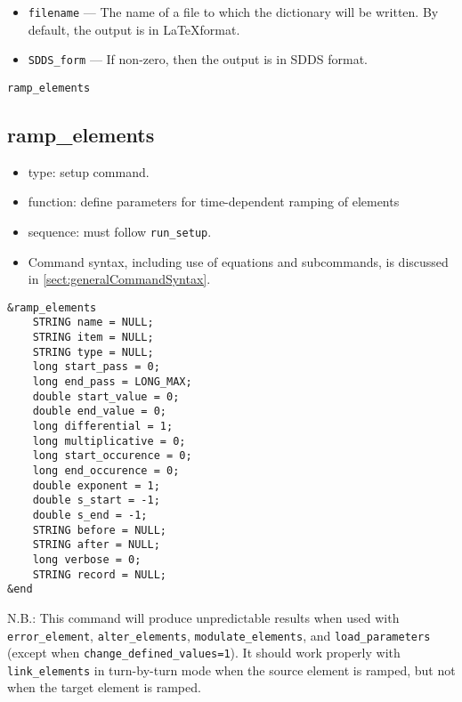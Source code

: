 \documentclass[11pt]{article}
\begin{document}
\begin{itemize}
\item \verb|filename| --- The name of a file to which the dictionary will be written.  By default, the 
  output is in \LaTeX format.
\item \verb|SDDS_form| --- If non-zero, then the output is in  SDDS format.
\end{itemize}

\newpage
\begin{center}{\Large\verb|ramp_elements|}\end{center}
\subsection{ramp\_elements\label{subsec:rampelements}}

\begin{itemize}
\item type: setup command.
\item function: define parameters for time-dependent ramping of elements
\item sequence: must follow \verb|run_setup|.
\item Command syntax, including use of equations and subcommands, is discussed in \ref{sect:generalCommandSyntax}.
\end{itemize}

\begin{verbatim}
&ramp_elements
    STRING name = NULL;
    STRING item = NULL;
    STRING type = NULL;
    long start_pass = 0;
    long end_pass = LONG_MAX;
    double start_value = 0;
    double end_value = 0;
    long differential = 1;
    long multiplicative = 0;
    long start_occurence = 0;
    long end_occurence = 0;
    double exponent = 1;
    double s_start = -1;
    double s_end = -1;
    STRING before = NULL;
    STRING after = NULL;
    long verbose = 0;
    STRING record = NULL;
&end
\end{verbatim}

N.B.: This command will produce unpredictable results when used with
\verb|error_element|, \verb|alter_elements|, \verb|modulate_elements|, and
\verb|load_parameters| (except when \verb|change_defined_values=1|).
It should work properly with \verb|link_elements| in turn-by-turn mode
when the source element is ramped, but not when the target element
is ramped.
\end{document}
